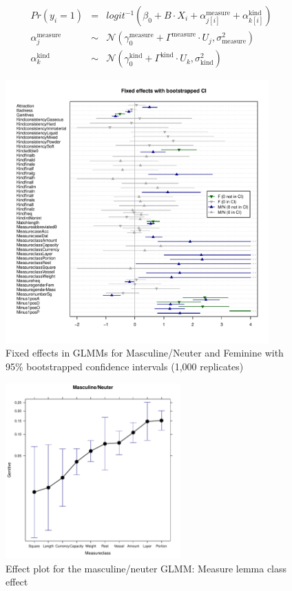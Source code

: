 \documentclass[USenglish]{article}
\begin{document}
\begin{eqnarray}
    \label{eq:model:mnglmm}
    Pr(y_i=1) &=& logit^{-1}(\beta_0 + B\cdot X_i + \alpha^{\text{measure}}_{j[i]} + \alpha^{\text{kind}}_{k[i]}) \\
    \alpha^{\text{measure}}_j &\sim& \mathcal{N}(\gamma_0^{\text{measure}} + \Gamma^{\text{measure}}\cdot U_j,\sigma^2_{\text{measure}}) \\
    \alpha^{\text{kind}}_k &\sim& \mathcal{N}(\gamma_0^{\text{kind}} + \Gamma^{\text{kind}}\cdot U_k,\sigma^2_{\text{kind}}) 
  \label{eq:model:mnglmm:alphakind}
\end{eqnarray}


\begin{figure}[h]
\centering
\includegraphics[width=0.9\textwidth]{figures/corpus/04_glmm_fixef.pdf}
\caption{Fixed effects in GLMMs for Masculine\slash Neuter and Feminine with 95\% bootstrapped confidence intervals (1,000 replicates)}
\label{fig:glmmfixef}
\end{figure}


\begin{figure}[h]
\centering
\includegraphics[width=0.6\textwidth]{figures/corpus/04_glmm_fixeff_mn_Measureclass}
\caption{Effect plot for the masculine\slash neuter GLMM: Measure lemma class effect}
\label{fig:glmm:fixef:measureclass}
\end{figure}
\end{document}
